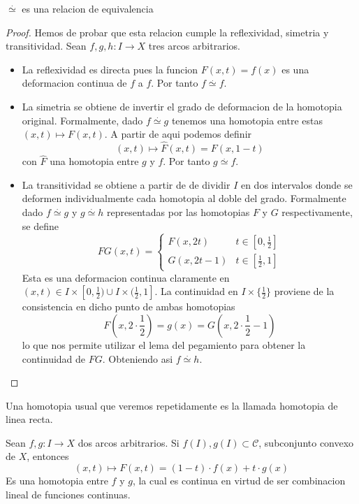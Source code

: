 \begin{teorema}
  \(\stackrel{.}{\simeq}\) es una relacion de equivalencia
\end{teorema}
\begin{proof}
  Hemos de probar que esta relacion cumple la reflexividad, simetria y
  transitividad. Sean \(f,g,h : I \to X\) tres arcos arbitrarios.
  \begin{itemize}
  \item La reflexividad es directa pues la funcion \(F(x,t) = f(x)\) es
    una deformacion continua de \(f\) a \(f\). Por tanto \(f
    \stackrel{.}{\simeq} f\).

  \item La simetria se obtiene de invertir el grado de deformacion de la
    homotopia original. Formalmente, dado \(f \stackrel{.}{\simeq} g\)
    tenemos una homotopia entre estas \((x,t) \mapsto F(x,t)\). A partir
    de aqui podemos definir
    \begin{equation}
      \label{eq:homotopy-simetry}
      (x,t) \mapsto \hat{F}(x,t) = F(x,1-t)
    \end{equation}
    con \(\hat{F}\) una homotopia entre \(g\) y \(f\). Por tanto \(g
    \stackrel{.}{\simeq} f\).


  \item La transitividad se obtiene a partir de de dividir \(I\) en dos
    intervalos donde se deformen individualmente cada homotopia al doble
    del grado. Formalmente dado \(f \stackrel{.}{\simeq} g\) y \(g
    \stackrel{.}{\simeq} h\) representadas por las homotopias \(F\) y
    \(G\) respectivamente, se define
    \[ FG(x,t) = \begin{cases}
        F(x,2t) & t \in [0,\frac{1}{2}] \\
        G(x,2t - 1) & t \in [ \frac{1}{2} , 1]
      \end{cases}
    \]
    Esta es una deformacion continua claramente en \((x,t) \in I \times
    [0, \frac{1}{2}) \cup I \times (\frac{1}{2}, 1]\). La continuidad en
    \(I \times \{\frac{1}{2}\}\) proviene de la consistencia en dicho
    punto de ambas homotopias
    \[ F(x,2 \cdot \frac{1}{2}) = g(x) = G(x, 2 \cdot \frac{1}{2} - 1)\]
    lo que nos permite utilizar el lema del pegamiento para obtener la
    continuidad de \(FG\). Obteniendo asi \(f \stackrel{.}{\simeq} h\).
  \end{itemize}
\end{proof}

Una homotopia usual que veremos repetidamente es la llamada homotopia de
linea recta.
\begin{definicion}\label{def:homotopia-linea}
  Sean \(f,g : I \to X\) dos arcos arbitrarios. Si \(f(I),g(I) \subset
  \mathcal C\), subconjunto convexo de \(X\), entonces
  \[ (x,t) \mapsto F(x,t) = (1-t) \cdot f(x) + t \cdot g(x) \]
  Es una homotopia entre \(f\) y \(g\), la cual es continua en virtud de
  ser combinacion lineal de funciones continuas.
\end{definicion}

